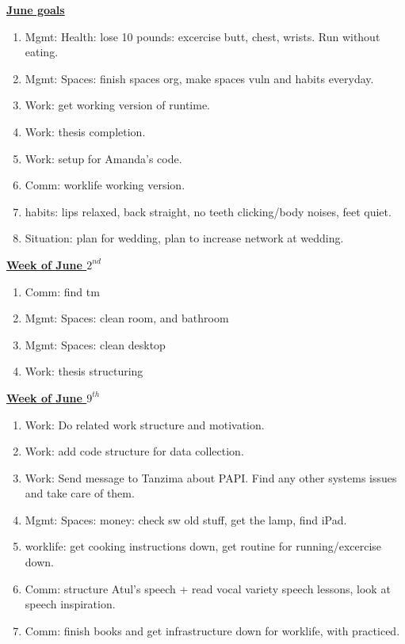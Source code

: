 
\underline{\textbf{June goals}} \\
\begin{enumerate}
\item Mgmt: Health: lose 10 pounds:  excercise butt, chest, wrists. Run without eating. 
\item Mgmt: Spaces: finish spaces org, make spaces vuln and habits everyday. 

\item Work: get working version of runtime.
\item Work: thesis completion.
\item Work: setup for Amanda's code. 

\item Comm: worklife working version. 
\item habits: lips relaxed, back straight, no teeth clicking/body noises, feet quiet. 
\item Situation: plan for wedding, plan to increase network at wedding. 
\end{enumerate}

\underline{\textbf{Week of June $2^{nd}$}} \\

\begin{enumerate}
\item Comm: find tm 
\item Mgmt: Spaces: clean room, and bathroom
\item Mgmt: Spaces: clean desktop
\item Work: thesis structuring 
\end{enumerate}

\underline{\textbf{Week of June $9^{th}$}} \\
\begin{enumerate}

\item Work: Do related work structure and motivation. 

\item Work: add code structure for data collection. 
\item Work: Send message to Tanzima about PAPI. Find any other systems issues and take care of them. 

\item Mgmt: Spaces: money: check sw old stuff, get the lamp, find iPad. 
\item worklife: get cooking instructions down, get routine for running/excercise down. 

\item Comm: structure Atul's speech + read vocal variety speech lessons, look at speech inspiration. 
\item Comm: finish books and get infrastructure down for worklife, with practiced. 

\end{enumerate}

